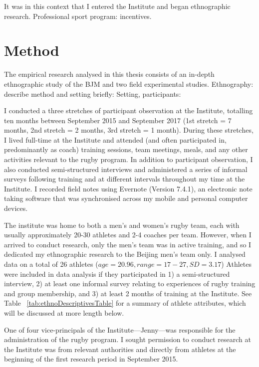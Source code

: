 \begin{CJK}{UTF8}{gbsn}
It was in this context that I entered the Institute and began ethnographic research.
Professional sport program: incentives.


\section{Method}
The empirical research analysed in this thesis consists of an in-depth ethnographic study of the BJM and two field experimental studies.
Ethnography: describe method and setting briefly:
Setting, participants:

I conducted a three stretches of participant observation at the Institute, totalling ten months between September 2015 and September 2017 (1st stretch = 7 months, 2nd stretch = 2 months, 3rd stretch = 1 month).  During these stretches, I lived full-time at the Institute and attended (and often participated in, predominantly as coach) training sessions, team meetings, meals, and any other activities relevant to the rugby program.  In addition to participant observation, I also conducted semi-structured interviews and administered a series of informal surveys following training and at different intervals throughout my time at the Institute.  I recorded field notes using Evernote (Version 7.4.1), an electronic note taking software that was synchronised across my mobile and personal computer devices.

The institute was home to both a men’s and women’s rugby team, each with usually approximately 20-30 athletes and 2-4 coaches per team.  However, when I arrived to conduct research, only the men’s team was in active training, and so I dedicated my ethnographic research to the Beijing men’s team only.  I analysed data on a total of 26 athletes ($age = 20.96, range = 17-27, SD = 3.17$)   Athletes were included in data analysis if they participated in 1) a semi-structured interview, 2) at least one informal survey relating to experiences of rugby training and group membership, and 3) at least 2 months of training at the Institute.  See Table ~\ref{tab:ethnoDescriptivesTable} for a summary of athlete attributes, which will be discussed at more length below.

One of four vice-principals of the Institute---Jenny---was responsible for the administration of the rugby program.  I sought permission to conduct research at the Institute was from relevant authorities and directly from athletes at the beginning of the first research period in September 2015.


\end{CJK}
